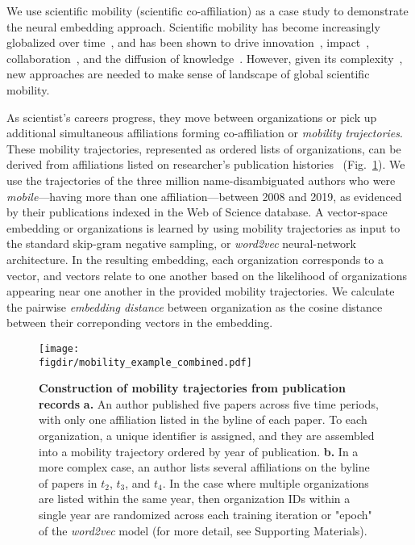 \documentclass[12pt]{article} %
\def\figdir{../Figs}
\begin{document}
We use scientific mobility (scientific co-affiliation) as a case study to demonstrate the neural embedding approach. 
Scientific mobility has become increasingly globalized over time~\autocite{czaika2018globalisation}, and has been shown to drive innovation~\autocite{braunerhjelm2020labor, kaiser2018innovation, armano2017innovation}, impact~\autocite{sugimoto2017mostimpact, petersen2018multiscale, jonkers2013return, franzoni2014advantage}, collaboration~\autocite{rodrigues2016mobility}, and the diffusion of knowledge~\autocite{braunerhjelm2020labor, azoulay2011diffusion, morgan2018prestige}.
However,  given its complexity~\autocite{robinson2019mobility, vannoorden2012mobility, deville2014career, ackers2008mobility, scott2015dynamics}, new approaches are needed to make sense of landscape of global scientific mobility. 

As scientist's careers progress, they move between organizations or pick up additional simultaneous affiliations forming co-affiliation or \textit{mobility trajectories}.
These mobility trajectories, represented as ordered lists of organizations, can be derived from affiliations listed on researcher's publication histories~\autocite{robinson2019mobility, sugimoto2017mostimpact} (Fig.~\ref{fig:methods:mobility_sentence}).
We use the trajectories of the three million name-disambiguated authors who were \textit{mobile}---having more than one affiliation---between 2008 and 2019, as evidenced by their publications indexed in the Web of Science database.
A vector-space embedding or organizations is learned by using mobility trajectories as input to the standard skip-gram negative sampling, or \textit{word2vec} neural-network architecture.
In the resulting embedding, each organization corresponds to a vector, and vectors relate to one another based on the likelihood of organizations appearing near one another in the provided mobility trajectories. 
We calculate the pairwise \textit{embedding distance} between organization as the cosine distance between their correponding vectors in the embedding.

%
%
\begin{figure}[ht!]
    \centering
    \texttt{[image: \\figdir/mobility\_example\_combined.pdf]}
    \caption{
        \textbf{Construction of mobility trajectories from publication records}
        \textbf{a.}
        An author published five papers across five time periods, with only one affiliation listed in the byline of each paper.
        To each organization, a unique identifier is assigned, and they are assembled into a mobility trajectory ordered by year of publication.
        \textbf{b.}
        In a more complex case, an author lists several affiliations on the byline of papers in $t_{2}$, $t_{3}$, and $t_{4}$. 
        In the case where multiple organizations are listed within the same year, then organization IDs within a single year are randomized across each training iteration or "epoch" of the \textit{word2vec} model (for more detail, see Supporting Materials). 
    }
    \label{fig:methods:mobility_sentence}
\end{figure}
\end{document}

